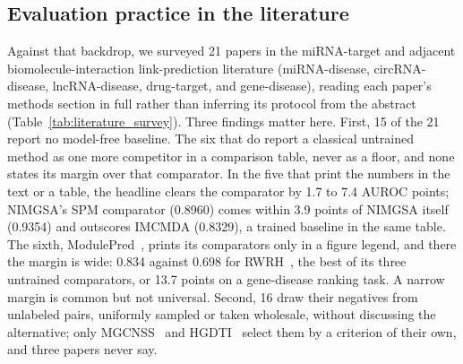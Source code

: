 \documentclass[review]{elsarticle}
\begin{document}
\subsection{Evaluation practice in the literature}
Against that backdrop, we surveyed 21 papers in the miRNA-target and adjacent
biomolecule-interaction link-prediction literature (miRNA-disease, circRNA-disease,
lncRNA-disease, drug-target, and gene-disease), reading each paper's methods section in
full rather than inferring its protocol from the abstract
(Table~\ref{tab:literature_survey}). Three findings matter here. First, 15 of the 21
report no model-free baseline. The six that do report a classical untrained method as one
more competitor in a comparison table, never as a floor, and none states its margin over
that comparator. In the five that print the numbers in the text or a table, the headline
clears the comparator by 1.7 to 7.4 AUROC points; NIMGSA's \cite{jin2022nimgsa} SPM
comparator (0.8960) comes within 3.9 points of NIMGSA itself (0.9354) and outscores IMCMDA
(0.8329), a trained baseline in the same table. The sixth, ModulePred~\cite{jia2024modulepred},
prints its comparators only in a figure legend, and there the margin is wide: 0.834 against
0.698 for RWRH~\cite{li2010rwrh}, the best of its three untrained comparators, or 13.7 points on a
gene-disease ranking task. A narrow margin is common but not universal.
Second, 16 draw their negatives from unlabeled pairs, uniformly sampled or taken wholesale,
without discussing the alternative; only MGCNSS~\cite{tian2024mgcnss} and
HGDTI~\cite{yu2022hgdti} select them by a criterion of their own, and three papers never say.
\end{document}
